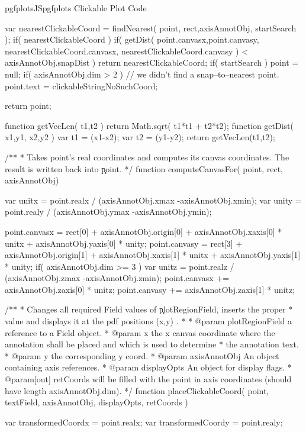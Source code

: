 {{\begin{insDLJS}[processAnnotatedPlot]{pgfplotsJS}{pgfplots Clickable Plot Code}
{	var nearestClickableCoord = findNearest( point, rect,axisAnnotObj, startSearch );
	if( nearestClickableCoord ) {
		if( getDist( point.canvasx,point.canvasy,  nearestClickableCoord.canvasx, nearestClickableCoord.canvasy ) < axisAnnotObj.snapDist ) {
			return nearestClickableCoord;
		}
	}
	if( startSearch )
		point = null;
	if( axisAnnotObj.dim > 2 ) { // we didn't find a snap--to--nearest point.
		point.text = clickableStringNoSuchCoord;
	}

	return point;
}

function getVecLen( t1,t2 ) {
	return Math.sqrt( t1*t1 + t2*t2);
}
function getDist( x1,y1, x2,y2 ) {
	var t1 = (x1-x2);
	var t2 = (y1-y2);
	return getVecLen(t1,t2);
}

/**
 * Takes point's real coordinates and computes its canvas coordinates. The result is written back into \c point.
 */
function computeCanvasFor( point, rect, axisAnnotObj)
{
	var unitx = point.realx / (axisAnnotObj.xmax -axisAnnotObj.xmin);
	var unity = point.realy / (axisAnnotObj.ymax -axisAnnotObj.ymin);

	point.canvasx = rect[0] + axisAnnotObj.origin[0] + axisAnnotObj.xaxis[0] * unitx + axisAnnotObj.yaxis[0] * unity;
	point.canvasy = rect[3] + axisAnnotObj.origin[1] + axisAnnotObj.xaxis[1] * unitx + axisAnnotObj.yaxis[1] * unity;
	if( axisAnnotObj.dim >= 3 ) {
		var unitz = point.realz / (axisAnnotObj.zmax -axisAnnotObj.zmin);
		point.canvasx += axisAnnotObj.zaxis[0] * unitz;
		point.canvasy += axisAnnotObj.zaxis[1] * unitz;
	}
}
/**
 * Changes all required Field values of \c plotRegionField, inserts the proper
 * value and displays it at the pdf positions (x,y) .
 *
 * @param plotRegionField a reference to a Field object.
 * @param x the x canvas coordinate where the annotation shall be placed and which is used to determine
 *  the annotation text.
 * @param y the corresponding y coord.
 * @param axisAnnotObj An object containing axis references.
 * @param displayOpts An object for display flags.
 * @param[out] retCoords will be filled with the point in axis coordinates (should have length axisAnnotObj.dim).
 */
function placeClickableCoord( point, textField, axisAnnotObj, displayOpts, retCoords )
{

	var transformedCoordx = point.realx;
	var transformedCoordy = point.realy;

}
\end{insDLJS}}}
